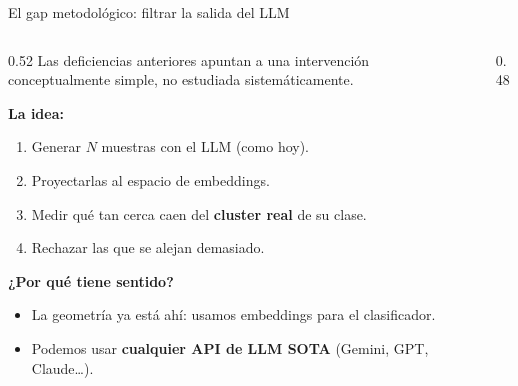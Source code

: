 \begin{frame}{El gap metodológico: filtrar la salida del LLM}
\begin{columns}[T]

\begin{column}{0.52\textwidth}
\small
Las deficiencias anteriores apuntan a una intervención conceptualmente simple, no estudiada sistemáticamente.

\vspace{0.4em}
\textbf{La idea:}
\begin{enumerate}\setlength\itemsep{1pt}\scriptsize
  \item Generar $N$ muestras con el LLM (como hoy).
  \item Proyectarlas al espacio de embeddings.
  \item Medir qué tan cerca caen del \textbf{cluster real} de su clase.
  \item \alert{Rechazar las que se alejan demasiado}.
\end{enumerate}

\vspace{0.4em}
\textbf{¿Por qué tiene sentido?}
\begin{itemize}\setlength\itemsep{1pt}\scriptsize
  \item La geometría \alert{ya está ahí}: usamos embeddings para el clasificador.
  \item Podemos usar \textbf{cualquier API de LLM SOTA} (Gemini, GPT, Claude\dots).
\end{itemize}
\end{column}

\begin{column}{0.48\textwidth}
\centering
\vspace{0.2em}
\end{column}
\end{columns}
\end{frame}
